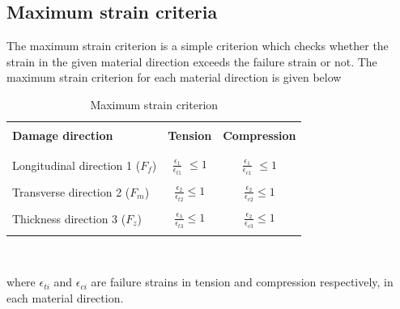 \documentclass[12pt]{report}
\begin{document}
\subsection{Maximum strain criteria}\label{Maximum strain criteria}
\indent\indent\indent The maximum strain criterion is a simple criterion which checks whether the strain in the given material direction exceeds the failure strain or not. The maximum strain criterion for each material direction is given below\\
\begin{table}[htbp]
  \begin{center}
     \begin{tabular}{l  c  c} 
     \hline
     \\
      \textbf{Damage direction} \;\;& \textbf{Tension} \;& \textbf{Compression}\\
      \\
      \hline
      \\
      Longitudinal direction 1 ($F_{f}$) & \Large{$\frac{\epsilon_{1}}{\epsilon_{t1}} $}\small{ $\leq 1$} &  \Large{$\frac{\epsilon_{1}}{\epsilon_{c1}} $}\small{ $\leq 1$}\\
      \\
      Transverse direction 2 ($F_{m}$)  &  \Large{$\frac{\epsilon_{2}}{\epsilon_{t2}} $}\small{$\leq 1$}  & \Large{$\frac{\epsilon_{2}}{\epsilon_{c2}} $}\small{$\leq 1$}\\
      \\
      Thickness direction 3 ($F_{z}$) &  \Large{$\frac{\epsilon_{3}}{\epsilon_{t3}} $}\small{$\leq 1$}  &   \Large{$\frac{\epsilon_{2}}{\epsilon_{c3}} $}\small{$\leq 1$}\\
       \\
       \hline
    \end{tabular}
    \\
    \caption{Maximum strain criterion}
    \label{tab:Maximum strain criterion}
  \end{center}
\end{table}
\FloatBarrier
where $\epsilon_{ti}$ and $\epsilon_{ci}$ are failure strains in tension and compression respectively, in each material direction. 
\\
\end{document}
